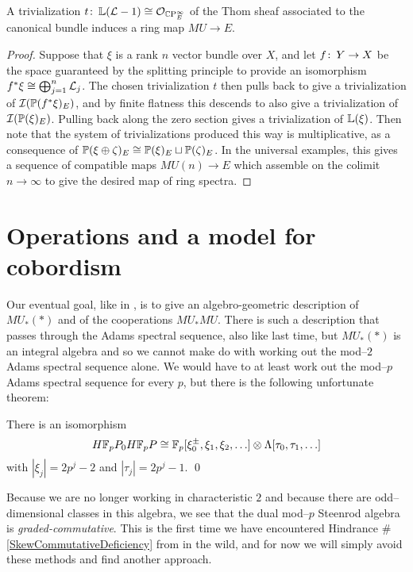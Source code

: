 \begin{theorem}
A trivialization $t\co \ThomSheaf{\L - 1} \cong \sheaf O_{\CP^\infty_E}$ of the Thom sheaf associated to the canonical bundle induces a ring map $MU \to E$.
\end{theorem}
\begin{proof}
Suppose that $\xi$ is a rank $n$ vector bundle over $X$, and let $f\co Y \to X$ be the space guaranteed by the splitting principle to provide an isomorphism $f^* \xi \cong \bigoplus_{j=1}^n \L_j$.  The chosen trivialization $t$ then pulls back to give a trivialization of $\sheaf I(\P(f^* \xi)_E)$, and by finite flatness this descends to also give a trivialization of $\sheaf I(\P(\xi)_E)$.  Pulling back along the zero section gives a trivialization of $\ThomSheaf{\xi}$.  Then note that the system of trivializations produced this way is multiplicative, as a consequence of $\P(\xi \oplus \zeta)_E \cong \P(\xi)_E \sqcup \P(\zeta)_E$.  In the universal examples, this gives a sequence of compatible maps $MU(n) \to E$ which assemble on the colimit $n \to \infty$ to give the desired map of ring spectra.
\end{proof}













\section{Operations and a model for cobordism}

Our eventual goal, like in , is to give an algebro-geometric description of $MU_*(*)$ and of the cooperations $MU_* MU$.  There is such a description that passes through the Adams spectral sequence, also like last time, but $MU_*(*)$ is an integral algebra and so we cannot make do with working out the mod--$2$ Adams spectral sequence alone.  We would have to at least work out the mod--$p$ Adams spectral sequence for every $p$, but there is the following unfortunate theorem:
\begin{theorem}
There is an isomorphism
\[H\F_pP_0 H\F_pP \cong \F_p[\xi_0^\pm, \xi_1, \xi_2, \ldots] \otimes \Lambda[\tau_0, \tau_1, \ldots]\]
with $|\xi_j| = 2p^j-2$ and $|\tau_j| = 2p^j - 1$. \qed
\end{theorem}
\noindent Because we are no longer working in characteristic $2$ and because there are odd--dimensional classes in this algebra, we see that the dual mod--$p$ Steenrod algebra is \emph{graded-commutative}.  This is the first time we have encountered Hindrance \#\ref{SkewCommutativeDeficiency} from  in the wild, and for now we will simply avoid these methods and find another approach.

